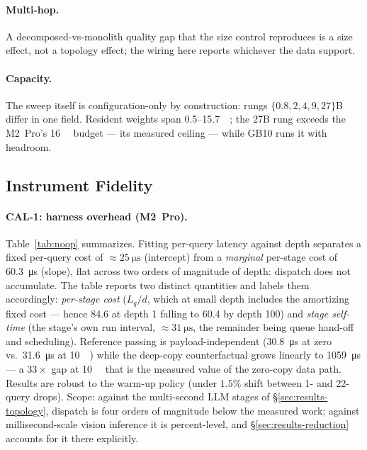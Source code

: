 \paragraph{Multi-hop.}  A decomposed-vs-monolith quality gap
that the size control reproduces is a size effect, not a topology effect;
the wiring here reports whichever the data support.

\paragraph{Capacity.} The sweep itself is configuration-only by
construction: rungs $\{0.8, 2, 4, 9, 27\}$B differ in one field. Resident
weights span \SI{0.5}{}--\SI{15.7}{\giga\byte}; the 27B rung exceeds the
M2~Pro's \SI{16}{\giga\byte} budget --- its measured ceiling --- while
GB10 runs it with headroom. 

\subsection{Instrument Fidelity}
\label{sec:results-fidelity}

\paragraph{CAL-1: harness overhead (M2~Pro).} Table~\ref{tab:noop}
summarizes. Fitting per-query latency against depth separates a fixed
per-query cost of ${\approx}\SI{25}{\micro\second}$ (intercept) from a
\emph{marginal} per-stage cost of \SI{60.3}{\micro\second} (slope), flat
across two orders of magnitude of depth: dispatch does not accumulate.
The table reports two distinct quantities and labels them accordingly:
\emph{per-stage cost} ($L_q/d$, which at small depth includes the
amortizing fixed cost --- hence 84.6 at depth 1 falling to 60.4 by depth
100) and \emph{stage self-time} (the stage's own run interval,
${\approx}\SI{31}{\micro\second}$, the remainder being queue hand-off and
scheduling). Reference passing is payload-independent
(\SI{30.8}{\micro\second} at zero vs.\ \SI{31.6}{\micro\second} at
\SI{10}{\mebi\byte}) while the deep-copy counterfactual grows linearly to
\SI{1059}{\micro\second} --- a $33\times$ gap at \SI{10}{\mebi\byte} that
is the measured value of the zero-copy data path. Results are robust to
the warm-up policy (under $1.5\%$ shift between 1- and 22-query drops).
Scope: against the multi-second LLM stages of
\S\ref{sec:results-topology}, dispatch is four orders of magnitude below
the measured work; against millisecond-scale vision inference it is
percent-level, and \S\ref{sec:results-reduction} accounts for it there
explicitly.

